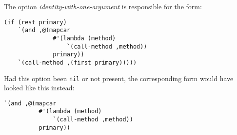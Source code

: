\noindent
The option \textit{identity-with-one-argument} is responsible for the
form:

{\small\begin{verbatim}
(if (rest primary)
    `(and ,@(mapcar
              #'(lambda (method)
                  `(call-method ,method))
              primary))
    `(call-method ,(first primary)))))
\end{verbatim}}

\noindent
Had this option been \texttt{nil} or not present, the corresponding
form would have looked like this instead:

{\small\begin{verbatim}
`(and ,@(mapcar
          #'(lambda (method)
              `(call-method ,method))
          primary))
\end{verbatim}}
